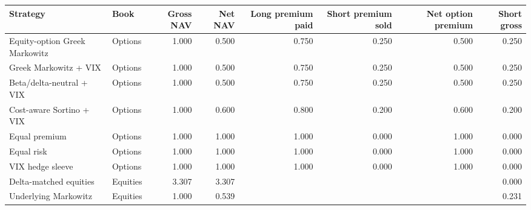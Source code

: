 \begin{tabular}{llrrrrrr}
\toprule
Strategy & Book & Gross NAV & Net NAV & Long premium paid & Short premium sold & Net option premium & Short gross \\
\midrule
Equity-option Greek Markowitz & Options & 1.000 & 0.500 & 0.750 & 0.250 & 0.500 & 0.250 \\
Greek Markowitz + VIX & Options & 1.000 & 0.500 & 0.750 & 0.250 & 0.500 & 0.250 \\
Beta/delta-neutral + VIX & Options & 1.000 & 0.500 & 0.750 & 0.250 & 0.500 & 0.250 \\
Cost-aware Sortino + VIX & Options & 1.000 & 0.600 & 0.800 & 0.200 & 0.600 & 0.200 \\
Equal premium & Options & 1.000 & 1.000 & 1.000 & 0.000 & 1.000 & 0.000 \\
Equal risk & Options & 1.000 & 1.000 & 1.000 & 0.000 & 1.000 & 0.000 \\
VIX hedge sleeve & Options & 1.000 & 1.000 & 1.000 & 0.000 & 1.000 & 0.000 \\
Delta-matched equities & Equities & 3.307 & 3.307 &  &  &  & 0.000 \\
Underlying Markowitz & Equities & 1.000 & 0.539 &  &  &  & 0.231 \\
\bottomrule
\end{tabular}
